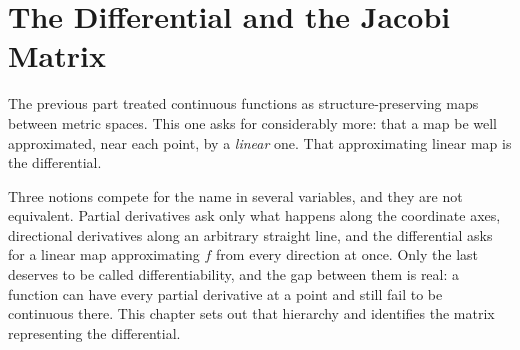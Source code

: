 \chapter{The Differential and the Jacobi Matrix}
\label{ch:differential}

The previous part treated continuous functions as structure-preserving maps between metric
spaces. This one asks for considerably more: that a map be well approximated, near each point, by
a \emph{linear} one. That approximating linear map is the differential.

Three notions compete for the name  in several variables, and they are not
equivalent. Partial derivatives ask only what happens along the coordinate axes, directional
derivatives along an arbitrary straight line, and the differential asks for a linear map
approximating $f$ from every direction at once. Only the last deserves to be called
differentiability, and the gap between them is real: a function can have every partial derivative
at a point and still fail to be continuous there. This chapter sets out that hierarchy and
identifies the matrix representing the differential.




